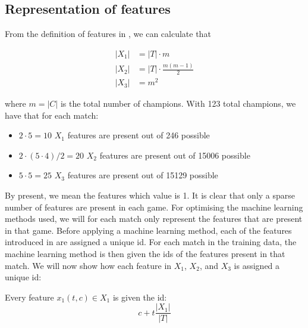 
\subsection{Representation of features}
\label{sec:representationoffeatures}
From the definition of features in , we can calculate that

\begin{align}
|X_1| &= |T| \cdot m \\ 
|X_2| &= |T| \cdot \frac{m(m-1)}{2} \\ 
|X_3| &= m^2  
\end{align}

where $m = |C|$ is the total number of champions. With 123 total champions, we have that for each match:
\begin{itemize}
\item $2 \cdot 5 = 10$ $X_1$ features are present out of 246 possible
\item $2 \cdot (5 \cdot 4)/2 = 20$ $X_2$ features are present out of 15006 possible
\item $5 \cdot 5 = 25$ $X_3$ features are present out of 15129 possible
\end{itemize}

By present, we mean the features which value is 1.
It is clear that only a sparse number of features are present in each game. 
For optimising the machine learning methods used, we will for each match only represent the features that are present in that game. 
Before applying a machine learning method, each of the features introduced in  are assigned a unique id.
For each match in the training data, the machine learning method is then given the ids of the features present in that match.
We will now show how each feature in $X_1$, $X_2$, and $X_3$ is assigned a unique id:

\begin{center}
Every feature $x_1(t, c) \in X_1$ is given the id:
\[ c + t \frac{|X_1|}{|T|} \]
\end{center}

